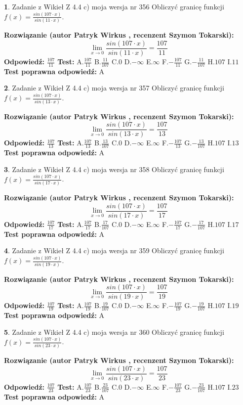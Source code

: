 \documentclass[12pt, a4paper]{article}
\theoremstyle{definition} %
\newtheorem{zad}{}
\newcommand{\zadStart}[1]{\begin{zad}#1\newline}
\newcommand{\zadStop}{\end{zad}}
\newcommand{\rozwStart}[2]{\noindent \textbf{Rozwiązanie (autor #1 , recenzent #2): }\newline}
\newcommand{\rozwStop}{\newline}
\newcommand{\odpStart}{\noindent \textbf{Odpowiedź:}\newline}
\newcommand{\odpStop}{\newline}
\newcommand{\testStart}{\noindent \textbf{Test:}\newline}
\newcommand{\testStop}{\newline}
\newcommand{\kluczStart}{\noindent \textbf{Test poprawna odpowiedź:}\newline}
\newcommand{\kluczStop}{\newline}
\begin{document}
\zadStart{Zadanie z Wikieł Z 4.4 c) moja wersja nr 356}
Obliczyć granicę funkcji $f(x)=\frac{sin(107\cdot x)}{sin(11\cdot x)}$.
\zadStop
\rozwStart{Patryk Wirkus}{Szymon Tokarski}
$$\lim\limits_{x\to 0}\frac{sin(107\cdot x)}{sin(11\cdot x)}=
\frac{107}{11}$$
\rozwStop
\odpStart
$\frac{107}{11}$
\odpStop
\testStart
A.$\frac{107}{11}$
B.$\frac{11}{107}$
C.$0$
D.$-\infty$
E.$\infty$
F.$-\frac{107}{11}$
G.$-\frac{11}{107}$
H.$107$
I.$11$
\testStop
\kluczStart
A
\kluczStop



\zadStart{Zadanie z Wikieł Z 4.4 c) moja wersja nr 357}
Obliczyć granicę funkcji $f(x)=\frac{sin(107\cdot x)}{sin(13\cdot x)}$.
\zadStop
\rozwStart{Patryk Wirkus}{Szymon Tokarski}
$$\lim\limits_{x\to 0}\frac{sin(107\cdot x)}{sin(13\cdot x)}=
\frac{107}{13}$$
\rozwStop
\odpStart
$\frac{107}{13}$
\odpStop
\testStart
A.$\frac{107}{13}$
B.$\frac{13}{107}$
C.$0$
D.$-\infty$
E.$\infty$
F.$-\frac{107}{13}$
G.$-\frac{13}{107}$
H.$107$
I.$13$
\testStop
\kluczStart
A
\kluczStop



\zadStart{Zadanie z Wikieł Z 4.4 c) moja wersja nr 358}
Obliczyć granicę funkcji $f(x)=\frac{sin(107\cdot x)}{sin(17\cdot x)}$.
\zadStop
\rozwStart{Patryk Wirkus}{Szymon Tokarski}
$$\lim\limits_{x\to 0}\frac{sin(107\cdot x)}{sin(17\cdot x)}=
\frac{107}{17}$$
\rozwStop
\odpStart
$\frac{107}{17}$
\odpStop
\testStart
A.$\frac{107}{17}$
B.$\frac{17}{107}$
C.$0$
D.$-\infty$
E.$\infty$
F.$-\frac{107}{17}$
G.$-\frac{17}{107}$
H.$107$
I.$17$
\testStop
\kluczStart
A
\kluczStop



\zadStart{Zadanie z Wikieł Z 4.4 c) moja wersja nr 359}
Obliczyć granicę funkcji $f(x)=\frac{sin(107\cdot x)}{sin(19\cdot x)}$.
\zadStop
\rozwStart{Patryk Wirkus}{Szymon Tokarski}
$$\lim\limits_{x\to 0}\frac{sin(107\cdot x)}{sin(19\cdot x)}=
\frac{107}{19}$$
\rozwStop
\odpStart
$\frac{107}{19}$
\odpStop
\testStart
A.$\frac{107}{19}$
B.$\frac{19}{107}$
C.$0$
D.$-\infty$
E.$\infty$
F.$-\frac{107}{19}$
G.$-\frac{19}{107}$
H.$107$
I.$19$
\testStop
\kluczStart
A
\kluczStop



\zadStart{Zadanie z Wikieł Z 4.4 c) moja wersja nr 360}
Obliczyć granicę funkcji $f(x)=\frac{sin(107\cdot x)}{sin(23\cdot x)}$.
\zadStop
\rozwStart{Patryk Wirkus}{Szymon Tokarski}
$$\lim\limits_{x\to 0}\frac{sin(107\cdot x)}{sin(23\cdot x)}=
\frac{107}{23}$$
\rozwStop
\odpStart
$\frac{107}{23}$
\odpStop
\testStart
A.$\frac{107}{23}$
B.$\frac{23}{107}$
C.$0$
D.$-\infty$
E.$\infty$
F.$-\frac{107}{23}$
G.$-\frac{23}{107}$
H.$107$
I.$23$
\testStop
\kluczStart
A
\kluczStop
\end{document}
